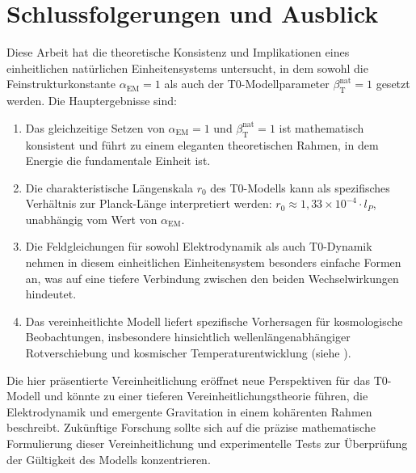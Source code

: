 \documentclass[12pt,a4paper]{article}
\newcommand{\alphaEM}{\alpha_{\text{EM}}}
\newcommand{\betaT}{\beta_{\text{T}}}
\begin{document}
	\section{Schlussfolgerungen und Ausblick}
	\label{sec:conclusions}
	
	Diese Arbeit hat die theoretische Konsistenz und Implikationen eines einheitlichen natürlichen Einheitensystems untersucht, in dem sowohl die Feinstrukturkonstante \(\alphaEM = 1\) als auch der T0-Modellparameter \(\betaT^{\text{nat}} = 1\) gesetzt werden. Die Hauptergebnisse sind:
	
	\begin{enumerate}
		\item Das gleichzeitige Setzen von \(\alphaEM = 1\) und \(\betaT^{\text{nat}} = 1\) ist mathematisch konsistent und führt zu einem eleganten theoretischen Rahmen, in dem Energie die fundamentale Einheit ist.
		\item Die charakteristische Längenskala \(r_0\) des T0-Modells kann als spezifisches Verhältnis zur Planck-Länge interpretiert werden: \(r_0 \approx 1,33 \times 10^{-4} \cdot l_P\), unabhängig vom Wert von \(\alphaEM\).
		\item Die Feldgleichungen für sowohl Elektrodynamik als auch T0-Dynamik nehmen in diesem einheitlichen Einheitensystem besonders einfache Formen an, was auf eine tiefere Verbindung zwischen den beiden Wechselwirkungen hindeutet.
		\item Das vereinheitlichte Modell liefert spezifische Vorhersagen für kosmologische Beobachtungen, insbesondere hinsichtlich wellenlängenabhängiger Rotverschiebung und kosmischer Temperaturentwicklung (siehe \cite{pascher_messdifferenzen_2025}).
	\end{enumerate}
	
	Die hier präsentierte Vereinheitlichung eröffnet neue Perspektiven für das T0-Modell und könnte zu einer tieferen Vereinheitlichungstheorie führen, die Elektrodynamik und emergente Gravitation in einem kohärenten Rahmen beschreibt. Zukünftige Forschung sollte sich auf die präzise mathematische Formulierung dieser Vereinheitlichung und experimentelle Tests zur Überprüfung der Gültigkeit des Modells konzentrieren.
	
\end{document}
